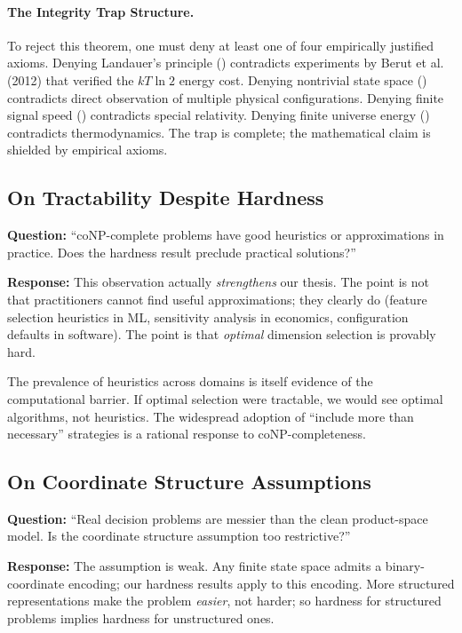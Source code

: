\paragraph{The Integrity Trap Structure.}
To reject this theorem, one must deny at least one of four empirically justified axioms. Denying Landauer's principle () contradicts experiments by Berut et al. (2012) that verified the $kT\ln 2$ energy cost. Denying nontrivial state space () contradicts direct observation of multiple physical configurations. Denying finite signal speed () contradicts special relativity. Denying finite universe energy () contradicts thermodynamics. The trap is complete; the mathematical claim is shielded by empirical axioms.

\subsection{On Tractability Despite Hardness}

\textbf{Question:} ``coNP-complete problems have good heuristics or approximations in practice. Does the hardness result preclude practical solutions?''

\textbf{Response:} This observation actually \emph{strengthens} our thesis. The point is not that practitioners cannot find useful approximations; they clearly do (feature selection heuristics in ML, sensitivity analysis in economics, configuration defaults in software). The point is that \emph{optimal} dimension selection is provably hard.

The prevalence of heuristics across domains is itself evidence of the computational barrier. If optimal selection were tractable, we would see optimal algorithms, not heuristics. The widespread adoption of ``include more than necessary'' strategies is a rational response to coNP-completeness.

\subsection{On Coordinate Structure Assumptions}

\textbf{Question:} ``Real decision problems are messier than the clean product-space model. Is the coordinate structure assumption too restrictive?''

\textbf{Response:} The assumption is weak. Any finite state space admits a binary-coordinate encoding; our hardness results apply to this encoding. More structured representations make the problem \emph{easier}, not harder; so hardness for structured problems implies hardness for unstructured ones.

